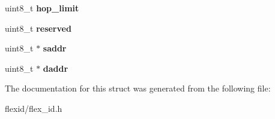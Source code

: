 \begin{DoxyCompactItemize}
\item 
uint8\+\_\+t {\bfseries hop\+\_\+limit}\hypertarget{structflexidhdr_a507914601558d094837046884f9b4d79}{}\label{structflexidhdr_a507914601558d094837046884f9b4d79}

\item 
uint8\+\_\+t {\bfseries reserved}\hypertarget{structflexidhdr_a79659668b865b2f14a1e5ac5e6ee63d5}{}\label{structflexidhdr_a79659668b865b2f14a1e5ac5e6ee63d5}

\item 
uint8\+\_\+t $\ast$ {\bfseries saddr}\hypertarget{structflexidhdr_ae5f70fa4b298c9ff8fd8ac56d94f52ab}{}\label{structflexidhdr_ae5f70fa4b298c9ff8fd8ac56d94f52ab}

\item 
uint8\+\_\+t $\ast$ {\bfseries daddr}\hypertarget{structflexidhdr_a9eb9cfa99f8f77520244cd96d55145f5}{}\label{structflexidhdr_a9eb9cfa99f8f77520244cd96d55145f5}

\end{DoxyCompactItemize}


The documentation for this struct was generated from the following file\+:\begin{DoxyCompactItemize}
\item 
flexid/flex\+\_\+id.\+h\end{DoxyCompactItemize}
